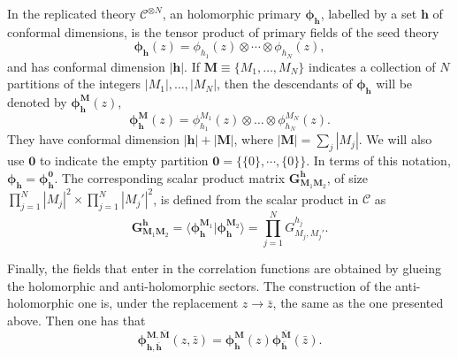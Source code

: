 \documentclass[a4paper,11pt]{article}
\begin{document}
In the replicated theory $\mathcal{C}^{\otimes N}$, an holomorphic primary $\boldsymbol{\phi_{h}}$, labelled by a set $\boldsymbol{h}$ of conformal dimensions, is the tensor product of primary fields of the seed theory
\begin{equation}
\boldsymbol{\phi}_{\boldsymbol{h}}(z)=\phi_{h_1}(z)\otimes \cdots\otimes \phi_{h_N}(z),
\end{equation}
and has conformal dimension $|\boldsymbol{h}|$. If $\boldsymbol{M}\equiv\{M_1,\dots,M_N\}$ indicates a collection of $N$ partitions of the integers $|M_1|,\dots,|M_N|$, then the descendants of $\boldsymbol{\phi}_{\boldsymbol{h}}$ will be denoted by $\boldsymbol{\phi}^{\boldsymbol{M}}_{\boldsymbol{h}}(z)$,
 \begin{equation}
 \boldsymbol{\phi}_{\boldsymbol{h}}^{\boldsymbol{M}}(z)=\phi_{h_1}^{M_1}(z)\otimes \dots \otimes \phi_{h_N}^{M_N}(z).
\end{equation}
They have conformal dimension $|\boldsymbol{h}|+|\boldsymbol{M}|$, where $|\boldsymbol{M}|=\sum_j |M_j|$. 
We will also use $\boldsymbol{0}$ to indicate the empty partition $\boldsymbol{0}=\{\{0\},\cdots,\{0\}\}$. In terms of this notation, 
$\boldsymbol{\phi}_{\boldsymbol{h}}=\boldsymbol{\phi}_{\boldsymbol{h}}^{\boldsymbol{0}}$.
The corresponding scalar product matrix $\boldsymbol{G}^{\boldsymbol{h}}_{\boldsymbol{M}_1\boldsymbol{M}_2}$, of size $\prod_{j=1}^{N}|M_j|^2\times \prod_{j=1}^{N}|M_j'|^2$, is defined from the scalar product in $\mathcal{C}$ as
\begin{equation}
\label{scal}
 \boldsymbol{G}^{\boldsymbol{h}}_{\boldsymbol{M}_1\boldsymbol{M}_2}=\langle \boldsymbol{\phi}_{\boldsymbol{h}}^{\boldsymbol{M}_1} | \boldsymbol{\phi}_{\boldsymbol{h}}^{\boldsymbol{M}_2}\rangle=\prod_{j=1}^N G^{h_j}_{M_j,M_j'}.
\end{equation}

 Finally, the fields that enter in the correlation functions are obtained by glueing the holomorphic and anti-holomorphic sectors.  The construction of the anti-holomorphic one is, under the replacement $z\to \bar{z}$, the same as the one presented above. Then one has that
\begin{equation}
\boldsymbol{\phi}^{\boldsymbol{M},\boldsymbol{\bar{M}}}_{\boldsymbol{h},\boldsymbol{\bar{h}}} (z,\bar{z})=\boldsymbol{\phi}^{\boldsymbol{M}}_{\boldsymbol{h}}(z)\boldsymbol{\phi}^{\boldsymbol{\bar{M}}}_{\boldsymbol{\bar{h}}}(\bar{z}).
\end{equation} 
\end{document}
